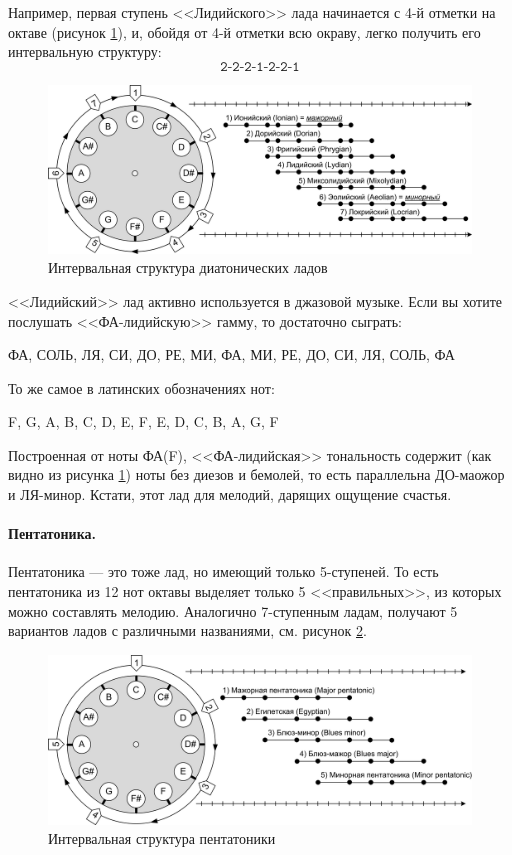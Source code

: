 Например, первая ступень <<Лидийского>> лада начинается с 4-й отметки на октаве (рисунок \ref{fig:harmony:lad:modes}), и, обойдя от 4-й отметки всю окраву, легко получить его интервальную структуру:
\[
    \texttt{2-2-2-1-2-2-1}
\]

\begin{figure}[!ht]
    \centering
    \includegraphics[width=\textwidth]{fig/intervals/modes} 
    \caption{Интервальная структура диатонических ладов}\label{fig:harmony:lad:modes}
\end{figure} 

<<Лидийский>> лад активно используется в джазовой музыке. Если вы хотите послушать <<ФА-лидийскую>> гамму, то достаточно сыграть:
\begin{center}
    ФА, СОЛЬ, ЛЯ, СИ, ДО, РЕ, МИ, ФА, МИ, РЕ, ДО, СИ, ЛЯ, СОЛЬ, ФА
\end{center}

То же самое в латинских обозначениях нот:
\begin{center}
    F, G, A, B, C, D, E, F, E, D, C, B, A, G, F
\end{center}
 
Построенная от ноты ФА(F), <<ФА-лидийская>> тональность содержит (как видно из рисунка \ref{fig:harmony:lad:modes}) ноты без диезов и бемолей, то есть параллельна ДО-маожор и ЛЯ-минор. Кстати, этот лад для мелодий, дарящих ощущение счастья.


\paragraph{Пентатоника.} Пентатоника --- это тоже лад, но имеющий только 5-ступеней. То есть пентатоника из 12 нот октавы выделяет только 5 <<правильных>>, из которых можно составлять мелодию. Аналогично 7-ступенным ладам, получают 5 вариантов ладов с различными названиями, см. рисунок \ref{fig:harmony:lad:pentatonic}.

\begin{figure}[!ht]
    \centering
    \includegraphics[width=\textwidth]{fig/intervals/pentatonic} 
    \caption{Интервальная структура пентатоники}\label{fig:harmony:lad:pentatonic}
\end{figure} 

